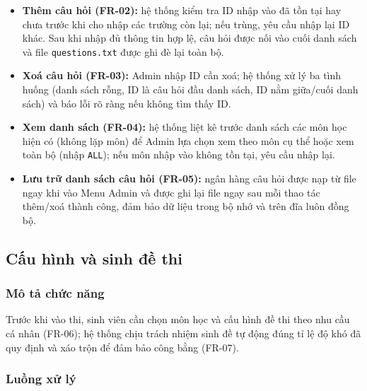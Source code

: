 \documentclass[11pt]{report}
\begin{document}
\begin{itemize}[leftmargin=*]
    \item \textbf{Thêm câu hỏi (FR-02):} hệ thống kiểm tra ID nhập vào đã tồn tại hay chưa trước khi cho nhập các trường còn lại; nếu trùng, yêu cầu nhập lại ID khác. Sau khi nhập đủ thông tin hợp lệ, câu hỏi được nối vào cuối danh sách và file \texttt{questions.txt} được ghi đè lại toàn bộ.
    \item \textbf{Xoá câu hỏi (FR-03):} Admin nhập ID cần xoá; hệ thống xử lý ba tình huống  (danh sách rỗng, ID là câu hỏi đầu danh sách, ID nằm giữa/cuối danh sách) và báo lỗi rõ ràng nếu không tìm thấy ID.
    \item \textbf{Xem danh sách (FR-04):} hệ thống liệt kê trước danh sách các môn học hiện có (không lặp môn) để Admin lựa chọn xem theo môn cụ thể hoặc xem toàn bộ (nhập \texttt{ALL}); nếu môn nhập vào không tồn tại, yêu cầu nhập lại.
    \item \textbf{Lưu trữ danh sách câu hỏi (FR-05):} ngân hàng câu hỏi được nạp từ file ngay khi vào Menu Admin và được ghi lại file ngay sau mỗi thao tác thêm/xoá thành công, đảm bảo dữ liệu trong bộ nhớ và trên đĩa luôn đồng bộ.
\end{itemize}

\subsection{Cấu hình và sinh đề thi}

\subsubsection{Mô tả chức năng}

Trước khi vào thi, sinh viên cần chọn môn học và cấu hình đề thi theo nhu cầu cá nhân (FR-06); hệ thống chịu trách nhiệm sinh đề tự động đúng tỉ lệ độ khó đã quy định và xáo trộn để đảm bảo công bằng (FR-07).

\subsubsection{Luồng xử lý}
\end{document}

